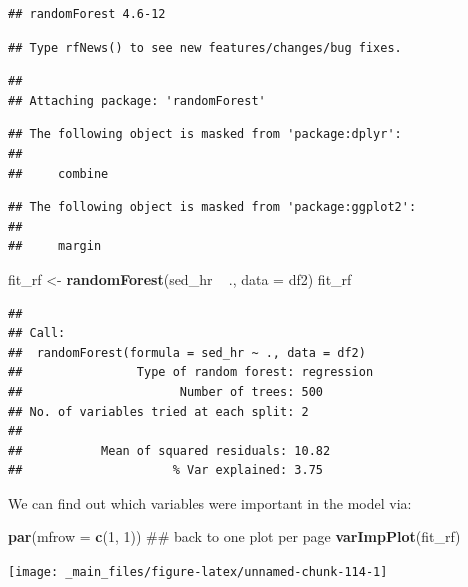 \documentclass[]{tufte-book}
\newenvironment{Shaded}{}{}
\newcommand{\KeywordTok}[1]{\textcolor[rgb]{0.00,0.44,0.13}{\textbf{#1}}}
\newcommand{\DataTypeTok}[1]{\textcolor[rgb]{0.56,0.13,0.00}{#1}}
\newcommand{\DecValTok}[1]{\textcolor[rgb]{0.25,0.63,0.44}{#1}}
\newcommand{\StringTok}[1]{\textcolor[rgb]{0.25,0.44,0.63}{#1}}
\newcommand{\OperatorTok}[1]{\textcolor[rgb]{0.40,0.40,0.40}{#1}}
\newcommand{\NormalTok}[1]{#1}
\theoremstyle{definition}
\theoremstyle{definition}
\theoremstyle{remark}
\begin{document}
\begin{verbatim}
## randomForest 4.6-12
\end{verbatim}

\begin{verbatim}
## Type rfNews() to see new features/changes/bug fixes.
\end{verbatim}

\begin{verbatim}
## 
## Attaching package: 'randomForest'
\end{verbatim}

\begin{verbatim}
## The following object is masked from 'package:dplyr':
## 
##     combine
\end{verbatim}

\begin{verbatim}
## The following object is masked from 'package:ggplot2':
## 
##     margin
\end{verbatim}

\begin{Shaded}
\begin{Highlighting}[]
\NormalTok{fit_rf <-}\StringTok{ }\KeywordTok{randomForest}\NormalTok{(sed_hr }\OperatorTok{~}\StringTok{ }\NormalTok{., }\DataTypeTok{data =}\NormalTok{ df2)}
\NormalTok{fit_rf}
\end{Highlighting}
\end{Shaded}

\begin{verbatim}
## 
## Call:
##  randomForest(formula = sed_hr ~ ., data = df2) 
##                Type of random forest: regression
##                      Number of trees: 500
## No. of variables tried at each split: 2
## 
##           Mean of squared residuals: 10.82
##                     % Var explained: 3.75
\end{verbatim}

We can find out which variables were important in the model via:

\begin{Shaded}
\begin{Highlighting}[]
\KeywordTok{par}\NormalTok{(}\DataTypeTok{mfrow =} \KeywordTok{c}\NormalTok{(}\DecValTok{1}\NormalTok{, }\DecValTok{1}\NormalTok{))  ## back to one plot per page}
\KeywordTok{varImpPlot}\NormalTok{(fit_rf)}
\end{Highlighting}
\end{Shaded}

\texttt{[image: \_main\_files/figure-latex/unnamed-chunk-114-1]}
\end{document}
